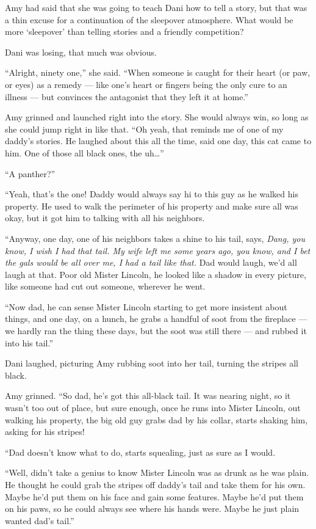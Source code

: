Amy had said that she was going to teach Dani how to tell a story, but that was a thin excuse for a continuation of the sleepover atmosphere. What would be more `sleepover' than telling stories and a friendly competition?

Dani was losing, that much was obvious.

``Alright, ninety one,'' she said. ``When someone is caught for their heart (or paw, or eyes) as a remedy --- like one's heart or fingers being the only cure to an illness --- but convinces the antagonist that they left it at home.''

Amy grinned and launched right into the story. She would always win, so long as she could jump right in like that. ``Oh yeah, that reminds me of one of my daddy's stories. He laughed about this all the time, said one day, this cat came to him. One of those all black ones, the uh\ldots{}''

``A panther?''

``Yeah, that's the one! Daddy would always say hi to this guy as he walked his property. He used to walk the perimeter of his property and make sure all was okay, but it got him to talking with all his neighbors.

``Anyway, one day, one of his neighbors takes a shine to his tail, says, \emph{Dang, you know, I wish I had that tail. My wife left me some years ago, you know, and I bet the gals would be all over me, I had a tail like that.} Dad would laugh, we'd all laugh at that. Poor old Mister Lincoln, he looked like a shadow in every picture, like someone had cut out someone, wherever he went.

``Now dad, he can sense Mister Lincoln starting to get more insistent about things, and one day, on a hunch, he grabs a handful of soot from the fireplace --- we hardly ran the thing these days, but the soot was still there --- and rubbed it into his tail.''

Dani laughed, picturing Amy rubbing soot into her tail, turning the stripes all black.

Amy grinned. ``So dad, he's got this all-black tail. It was nearing night, so it wasn't too out of place, but sure enough, once he runs into Mister Lincoln, out walking his property, the big old guy grabs dad by his collar, starts shaking him, asking for his stripes!

``Dad doesn't know what to do, starts squealing, just as sure as I would.

``Well, didn't take a genius to know Mister Lincoln was as drunk as he was plain. He thought he could grab the stripes off daddy's tail and take them for his own. Maybe he'd put them on his face and gain some features. Maybe he'd put them on his paws, so he could always see where his hands were. Maybe he just plain wanted dad's tail.''

